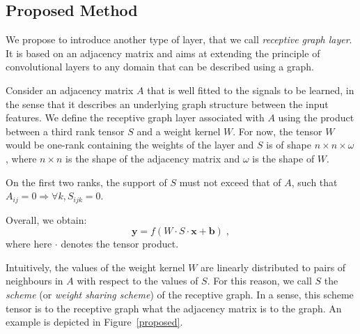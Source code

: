 \subsection{Proposed Method}

We propose to introduce another type of layer, that we call \textit{receptive graph layer}. It is based on an adjacency matrix and aims at extending the principle of convolutional layers to any domain that can be described using a graph.

Consider an adjacency matrix $A$ that is well fitted to the signals to be learned, in the sense that it describes an underlying graph structure between the input features. We define the receptive graph layer associated with $A$ using the product between a third rank tensor $S$ and a weight kernel $W$. For now, the tensor $W$ would be one-rank containing the weights of the layer and $S$ is of shape $n\times n \times \omega$, where $n\times n$ is the shape of the adjacency matrix and $\omega$ is the shape of $W$.

On the first two ranks, the support of $S$ must not exceed that of $A$, such that $A_{ij} = 0 \Rightarrow \forall k, S_{ijk} = 0$.

Overall, we obtain:
\[
\mathbf{y} = f(W\cdot S \cdot \mathbf{x} + \mathbf{b})\;,
\]
where here $\cdot$ denotes the tensor product.

Intuitively, the values of the weight kernel $W$ are linearly distributed to pairs of neighbours in $A$ with respect to the values of $S$. For this reason, we call $S$ the \textit{scheme} (or \textit{weight sharing scheme}) of the receptive graph. In a sense, this scheme tensor is to the receptive graph what the adjacency matrix is to the graph. An example is depicted in Figure~\ref{proposed}.


